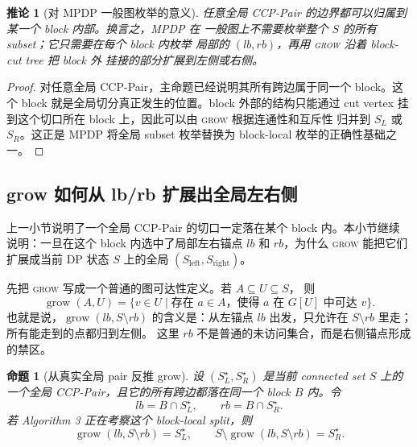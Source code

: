 \documentclass[UTF8]{ctexart}
\newtheorem{proposition}{命题}[section]
\newtheorem{corollary}{推论}[section]
\begin{document}
\begin{corollary}[对 MPDP 一般图枚举的意义]
任意全局 CCP-Pair 的边界都可以归属到某一个 block 内部。换言之，MPDP 在
一般图上不需要枚举整个 \(S\) 的所有 subset；它只需要在每个 block 内枚举
局部的 \((lb,rb)\)，再用 \textsc{grow} 沿着 block-cut tree 把 block 外
挂接的部分扩展到左侧或右侧。
\end{corollary}

\begin{proof}
对任意全局 CCP-Pair，主命题已经说明其所有跨边属于同一个 block。这个
block 就是全局切分真正发生的位置。block 外部的结构只能通过 cut vertex
挂到这个切口所在 block 上，因此可以由 \textsc{grow} 根据连通性和互斥性
归并到 \(S_L\) 或 \(S_R\)。这正是 MPDP 将全局 subset 枚举替换为
block-local 枚举的正确性基础之一。
\end{proof}

\subsection{grow 如何从 lb/rb 扩展出全局左右侧}

上一小节说明了一个全局 CCP-Pair 的切口一定落在某个 block 内。本小节继续
说明：一旦在这个 block 内选中了局部左右锚点 \(lb\) 和 \(rb\)，为什么
\textsc{grow} 能把它们扩展成当前 DP 状态 \(S\) 上的全局
\((S_{\mathrm{left}},S_{\mathrm{right}})\)。

先把 \textsc{grow} 写成一个普通的图可达性定义。若 \(A\subseteq U\subseteq S\)，
则
\[
\operatorname{grow}(A,U)
=\{v\in U\mid \text{存在 }a\in A\text{，使得 }a\text{ 在 }G[U]\text{ 中可达 }v\}.
\]
也就是说，\(\operatorname{grow}(lb,S\setminus rb)\) 的含义是：从左锚点
\(lb\) 出发，只允许在 \(S\setminus rb\) 里走；所有能走到的点都归到左侧。
这里 \(rb\) 不是普通的未访问集合，而是右侧锚点形成的禁区。

\begin{proposition}[从真实全局 pair 反推 grow]
设 \((S_L^\star,S_R^\star)\) 是当前 connected set \(S\) 上的一个全局
CCP-Pair，且它的所有跨边都落在同一个 block \(B\) 内。令
\[
lb=B\cap S_L^\star,\qquad rb=B\cap S_R^\star.
\]
若 Algorithm 3 正在考察这个 block-local split，则
\[
\operatorname{grow}(lb,S\setminus rb)=S_L^\star,
\qquad
S\setminus \operatorname{grow}(lb,S\setminus rb)=S_R^\star.
\]
\end{proposition}
\end{document}
